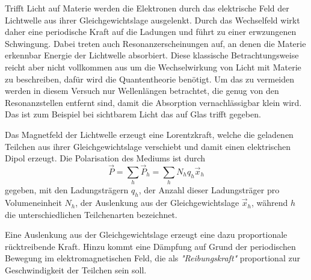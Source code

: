 Trifft Licht auf Materie werden die Elektronen durch das elektrische Feld
der Lichtwelle aus ihrer Gleichgewichtslage ausgelenkt. Durch das Wechselfeld wirkt daher eine periodische Kraft auf die Ladungen und führt zu einer erwzungenen Schwingung. Dabei treten auch Resonanzerscheinungen auf, an denen die Materie erkennbar Energie der Lichtwelle absorbiert. Diese klassische Betrachtungsweise reicht aber nicht vollkommen aus um die Wechselwirkung von Licht mit Materie zu beschreiben, dafür wird die Quantentheorie benötigt. Um das zu vermeiden werden in diesem Versuch nur Wellenlängen betrachtet, die genug von den Resonanzstellen entfernt sind, damit die Absorption vernachlässigbar klein wird. Das ist zum Beispiel bei sichtbarem Licht das auf Glas trifft gegeben.

Das Magnetfeld der Lichtwelle erzeugt eine Lorentzkraft, welche die geladenen Teilchen aus ihrer Gleichgewichtslage verschiebt und damit einen elektrischen Dipol erzeugt. Die Polarisation des Mediums ist durch
\begin{equation}
  \vec P = \sum_{h} \vec P_h = \sum_{h} N_h q_h \vec x_h
  \label{equ:P}
\end{equation}
gegeben, mit den Ladungsträgern $q_h$, der Anzahl dieser Ladungsträger pro Volumeneinheit $N_h$, der Auslenkung aus der Gleichgewichtslage $\vec x_h$, während $h$ die unterschiedlichen Teilchenarten bezeichnet.

Eine Auslenkung aus der Gleichgewichtslage erzeugt eine dazu proportionale rücktreibende Kraft. Hinzu kommt eine Dämpfung auf Grund der periodischen Bewegung im elektromagnetischen Feld, die als \emph{"Reibungskraft"} proportional zur Geschwindigkeit der Teilchen sein soll.

